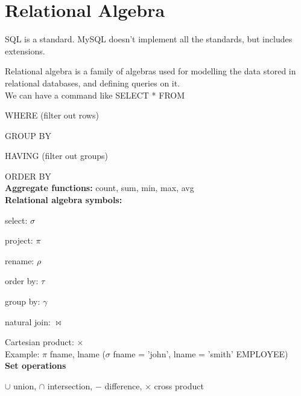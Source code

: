 \documentclass[english]{exam}
\begin{document}
	
    \section{Relational Algebra}
    
    SQL is a standard. MySQL doesn't implement all the standards, but includes extensions.
    
    Relational algebra is a family of algebras used for modelling the data stored in relational databases, and defining queries on it.\\
    
    We can have a command like SELECT * FROM 
    
    WHERE (filter out rows) 
    
    GROUP BY 
    
    HAVING (filter out groups) 
    
    ORDER BY\\
    
    \textbf{Aggregate functions:} count, sum, min, max, avg\\
    
    \textbf{Relational algebra symbols:}
    
    select: $\sigma$
    
    project: $\pi$
    
    rename: $\rho$
    
    order by: $\tau$
    
    group by: $\gamma$
    
    natural join: $\bowtie$
    
    Cartesian product: $\times$\\
    
    Example: $\pi$ fname, lname ($\sigma$ fname = 'john', lname = 'smith' EMPLOYEE)\\
    
    \textbf{Set operations}
    
    $\cup$ union, $\cap$ intersection, $-$ difference, $\times$ cross product
    
    
    
\end{document}
